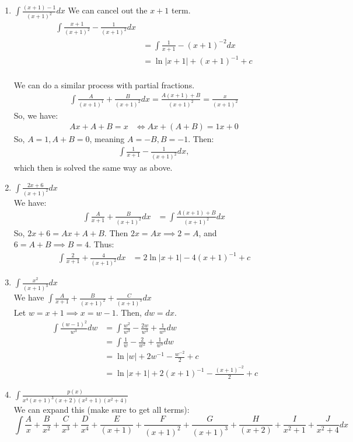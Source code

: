\documentclass{article}
\begin{document}
\begin{enumerate}
    \item $\int \frac{(x+1)-1}{(x+1)^2}dx$
    We can cancel out the $x+1$ term.
    \begin{align*}
        \int \frac{x+1}{(x+1)^2} - \frac{1}{(x+1)^2} dx\\
        & = \int \frac{1}{x+1} - (x+1)^{-2} dx\\
        & = \ln |x+1| + (x+1)^{-1} + c
    \end{align*}
    \\
    We can do a similar process with partial fractions.
    \begin{align*}
        \int \frac{A}{(x+1)^1} + \frac{B}{(x+1)^2} dx = \frac{A(x+1) +B}{(x+1)^2}  = \frac{x}{(x+1)^2}
    \end{align*}
    So, we have:
    \begin{align*}
        Ax + A + B = x & \iff Ax + (A+B) = 1x + 0 
    \end{align*}
    So, $A = 1, A+B=0$, meaning $A = -B, B = -1$. Then:
    \begin{align*}
    \int \frac{1}{x+1} - \frac{1}{(x+1)^2}dx,
    \end{align*}
    which then is solved the same way as above.
    
    \item $\int\frac{2x+6}{(x+1)^2}dx$\\
    We have:
    \begin{align*}
        \int \frac{A}{x+1} + \frac{B}{(x+1)^2}dx & = \int \frac{A(x+1) +B}{(x+1)^2}dx
    \end{align*}
    So, $2x+6 = Ax + A + B$. Then $2x = Ax \implies 2 = A$, and $6 = A + B \implies B = 4$. Thus:
    \begin{align*}
        \int \frac{2}{x+1} + \frac{4}{(x+1)^2}dx & = 2 \ln|x+1| - 4(x+1)^{-1} +c
    \end{align*}
    
    \item $\int \frac{x^2}{(x+1)^3}dx$\\
    We have $\int \frac{A}{x+1} + \frac{B}{(x+1)^2} + \frac{C}{(x+1)^3}dx$\\
    Let $w = x+1 \implies x = w -1$. Then, $dw = dx$.
    \begin{align*}\
    \int \frac{(w-1)^2}{w^3}dw & =\int \frac{w^2}{w^3} - \frac{2w}{w^3} + \frac{1}{w^3}dw\\
    & = \int \frac{1}{w} - \frac{2}{w^2} + \frac{1}{w^3}dw\\
    & = \ln |w| + 2w^{-1} - \frac{w^{-2}}{2} + c\\
    & = \ln |x+1| + 2(x+1)^{-1} - \frac{(x+1)^{-2}}{2} + c
    \end{align*}
    
    \item $\int \frac{p(x)}{x^4(x+1)^3(x+2)(x^2+1)(x^2+4)}$\\
    We can expand this (make sure to get all terms):
    $$\int \frac{A}{x} + \frac{B}{x^2} + \frac{C}{x^3} + \frac{D}{x^4} + \frac{E}{(x+1)} + \frac{F}{(x+1)^2} + \frac{G}{(x+1)^3} + \frac{H}{(x+2)} + \frac{I}{x^2+1} + \frac{J}{x^2+4} dx$$
\end{enumerate}
\end{document}
